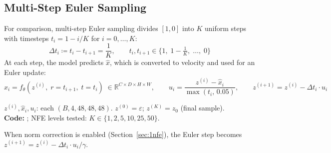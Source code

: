 \subsection{Multi-Step Euler Sampling}

For comparison, multi-step Euler sampling divides $[1,0]$ into $K$ uniform
steps with timesteps $t_i = 1 - i/K$ for $i = 0, \ldots, K$:
\begin{equation}
  \Delta t_i \coloneqq t_i - t_{i+1} = \frac{1}{K},
  \qquad
  t_i, t_{i+1} \in \{1,\;1{-}\tfrac{1}{K},\;\ldots,\;0\}
  \label{eq:euler_times}
\end{equation}
At each step, the model predicts $\hat{x}$, which is converted to velocity
and used for an Euler update:
\begin{equation}
  \hat{x}_i = f_\theta(z^{(i)},\;r{=}t_{i+1},\;t{=}t_i)
    \;\in \mathbb{R}^{C \times D \times H \times W},
  \qquad
  u_i = \frac{z^{(i)}-\hat{x}_i}{\max(t_i,\,0.05)},
  \qquad
  z^{(i+1)} = z^{(i)} - \Delta t_i \cdot u_i
  \label{eq:euler_step}
\end{equation}
\begin{shapes}
$z^{(i)}, \hat{x}_i, u_i$: each $(B, 4, 48, 48, 48)$.
\quad $z^{(0)} = \varepsilon$; $z^{(K)} = z_0$ (final sample).\\
\textbf{Code:} ; NFE levels tested: $K \in \{1,2,5,10,25,50\}$.
\end{shapes}

When norm correction is enabled (Section~\ref{sec:1nfe}), the Euler step
becomes $z^{(i+1)} = z^{(i)} - \Delta t_i \cdot u_i / \gamma$.
